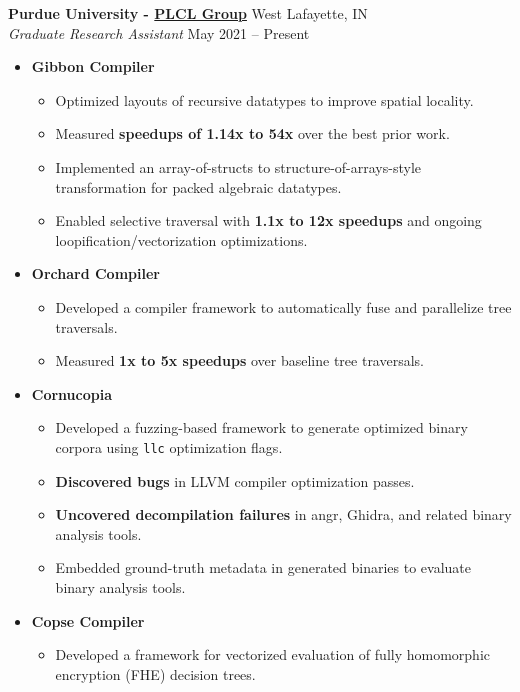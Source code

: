 \documentclass[10pt,letterpaper]{article}
\begin{document}
\textbf{Purdue University - \textcolor{ultramarineblue}{\href{https://engineering.purdue.edu/~milind/}{PLCL Group}}} \hfill West Lafayette, IN\\
\textit{Graduate Research Assistant} \hfill May 2021 -- Present
\begin{itemize}
	     \item \textbf{Gibbon Compiler}
	      \begin{itemize}
	       \item Optimized layouts of recursive datatypes to improve spatial locality.
	       \item Measured \textbf{speedups of 1.14x to 54x} over the best prior work.
	       \item Implemented an array-of-structs to structure-of-arrays-style transformation for packed algebraic datatypes.
	       \item Enabled selective traversal with \textbf{1.1x to 12x speedups} and ongoing loopification/vectorization optimizations.
	       \end{itemize}
       \item \textbf{Orchard Compiler}
       \begin{itemize}
       \item Developed a compiler framework to automatically fuse and parallelize tree traversals.
	       \item Measured \textbf{1x to 5x speedups} over baseline tree traversals.
	       \end{itemize}
      \item \textbf{Cornucopia}
      \begin{itemize} 
	      \item Developed a fuzzing-based framework to generate optimized binary corpora using \texttt{llc} optimization flags.
	      \item \textbf{Discovered bugs} in LLVM compiler optimization passes.
	      \item \textbf{Uncovered decompilation failures} in angr, Ghidra, and related binary analysis tools.
	      \item Embedded ground-truth metadata in generated binaries to evaluate binary analysis tools.
	      \end{itemize}
	      \item \textbf{Copse Compiler}
	      \begin{itemize} 
	      \item Developed a framework for vectorized evaluation of fully homomorphic encryption (FHE) decision trees.
      \end{itemize}
\end{itemize}
\end{document}
